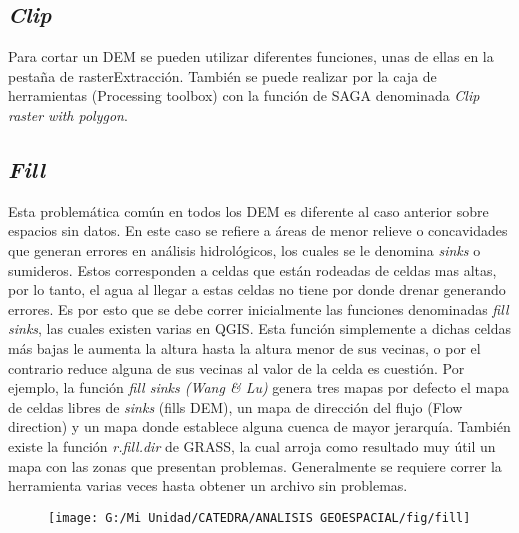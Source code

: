 \documentclass[a4paper,oneside,11pt,]{article}
\begin{document}
\subsection{\emph{Clip}}

Para cortar un DEM se pueden utilizar diferentes funciones, unas de ellas en la pestaña de raster\textrightarrow Extracción. También se puede realizar por la caja de herramientas (Processing toolbox) con la función de SAGA denominada \emph{Clip raster with polygon}.

\subsection{\emph{Fill}}

Esta problemática común en todos los DEM es diferente al caso anterior sobre espacios sin datos. En este caso se refiere a áreas de menor relieve o concavidades que generan errores en análisis hidrológicos, los cuales se le denomina \emph{sinks} o sumideros. Estos corresponden a celdas que están rodeadas de celdas mas altas, por lo tanto, el agua al llegar a estas celdas no tiene por donde drenar generando errores. Es por esto que se debe correr inicialmente las funciones denominadas \emph{fill sinks}, las cuales existen varias en QGIS. Esta función simplemente a dichas celdas más bajas le aumenta la altura hasta la altura menor de sus vecinas, o por el contrario reduce alguna de sus vecinas al valor de la celda es cuestión. Por ejemplo, la función \emph{fill sinks (Wang \& Lu)} genera tres mapas por defecto el mapa de celdas libres de \emph{sinks} (fills DEM), un mapa de dirección del flujo (Flow direction) y un mapa donde establece alguna cuenca de mayor jerarquía. También existe la función \emph{r.fill.dir} de GRASS, la cual arroja como resultado muy útil un mapa con las zonas que presentan problemas. Generalmente se requiere correr la herramienta varias veces hasta obtener un archivo sin problemas.

\begin{figure}
\centering
\texttt{[image: G:/Mi Unidad/CATEDRA/ANALISIS GEOESPACIAL/fig/fill]}
\end{figure}
\end{document}
